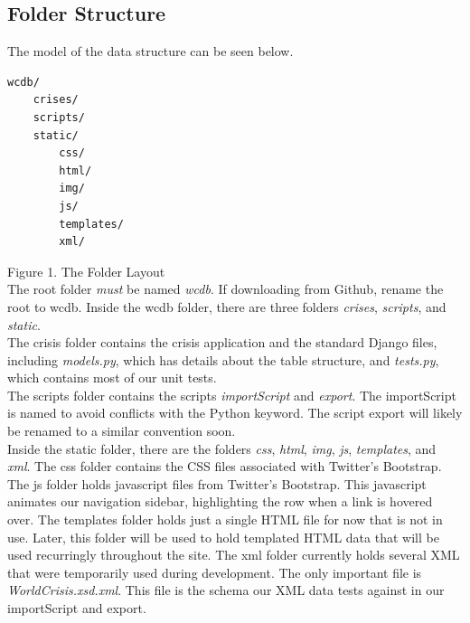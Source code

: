 \documentclass[12pt]{report}
\begin{document}
\subsection*{Folder Structure}
\hfill


The model of the data structure can be seen below.\\

\begin{lstlisting}
wcdb/
    crises/
    scripts/
    static/
        css/
        html/
        img/
        js/
        templates/
        xml/
\end{lstlisting}
\footnotesize Figure 1. The Folder Layout \normalsize
\hfill\\


The root folder \emph{must} be named \emph{wcdb}.
If downloading from Github, rename the root to wcdb.
Inside the wcdb folder, there are three folders \emph{crises}, \emph{scripts}, and \emph{static}.\\


The crisis folder contains the crisis application and the standard Django files,
including \emph{models.py}, which has details about the table structure, and \emph{tests.py}, which contains
most of our unit tests.\\


The scripts folder contains the scripts \emph{importScript} and \emph{export}.
The importScript is named to avoid conflicts with the Python keyword.
The script export will likely be renamed to a similar convention soon.\\


Inside the static folder, there are the folders \emph{css}, \emph{html}, \emph{img}, \emph{js}, \emph{templates}, and \emph{xml}.
The css folder contains the CSS files associated with Twitter's Bootstrap.\\


The js folder holds javascript files from Twitter's Bootstrap.
This javascript animates our navigation sidebar, highlighting the row when a link is hovered over.
The templates folder holds just a single HTML file for now that is not in use.
Later, this folder will be used to hold templated HTML data that will be used recurringly throughout the site.
The xml folder currently holds several XML that were temporarily used during development.
The only important file is \emph{WorldCrisis.xsd.xml}.
This file is the schema our XML data tests against in our importScript and export.\\
\end{document}
